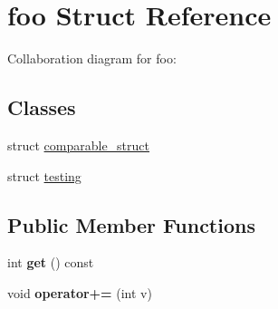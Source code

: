 \hypertarget{classfoo}{}\section{foo Struct Reference}
\label{classfoo}


Collaboration diagram for foo\+:
\subsection*{Classes}
\begin{DoxyCompactItemize}
\item 
struct \mbox{\hyperlink{structfoo_1_1comparable__struct}{comparable\+\_\+struct}}
\item 
struct \mbox{\hyperlink{structfoo_1_1testing}{testing}}
\end{DoxyCompactItemize}
\subsection*{Public Member Functions}
\begin{DoxyCompactItemize}
\item 
\mbox{\label{classfoo_a205b560c59bfd15d56ddb9a70a31f81e}} 
int {\bfseries get} () const
\item 
\mbox{\label{classfoo_af75cf31379559a01c69945fd44f90429}} 
void {\bfseries operator+=} (int v)
\end{DoxyCompactItemize}
